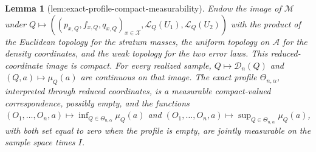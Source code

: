 \documentclass{article}
\newtheorem{lemma}{Lemma}
\begin{document}
\begin{lemma}[lem:exact-profile-compact-measurability]\label{lem:exact-profile-compact-measurability}
Endow the image of \(\mathcal M\) under \(Q\mapsto((p_{x,Q},f_{x,Q},q_{x,Q})_{x\in\mathcal X},\mathcal L_Q(U_1),\mathcal L_Q(U_2))\) with the product of the Euclidean topology for the stratum masses, the uniform topology on \(\mathcal A\) for the density coordinates, and the weak topology for the two error laws.  This reduced-coordinate image is compact.  For every realized sample, \(Q\mapsto\mathscr D_n(Q)\) and \((Q,a)\mapsto\mu_Q(a)\) are continuous on that image.  The exact profile \(\Theta_{n,\alpha}\), interpreted through reduced coordinates, is a measurable compact-valued correspondence, possibly empty, and the functions \((O_1,\ldots,O_n,a)\mapsto\inf_{Q\in\Theta_{n,\alpha}}\mu_Q(a)\) and \((O_1,\ldots,O_n,a)\mapsto\sup_{Q\in\Theta_{n,\alpha}}\mu_Q(a)\), with both set equal to zero when the profile is empty, are jointly measurable on the sample space times \(I\).
\end{lemma}
\end{document}
